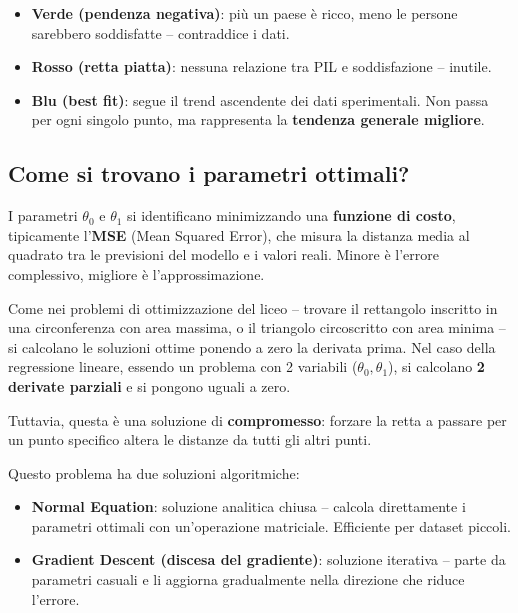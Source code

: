 \begin{itemize}
    \item \textbf{Verde (pendenza negativa)}: più un paese è ricco, meno le persone sarebbero soddisfatte -- contraddice i dati.
    \item \textbf{Rosso (retta piatta)}: nessuna relazione tra PIL e soddisfazione -- inutile.
    \item \textbf{Blu (best fit)}: segue il trend ascendente dei dati sperimentali. Non passa per ogni singolo punto, ma rappresenta la \textbf{tendenza generale migliore}.
\end{itemize}

\subsection{Come si trovano i parametri ottimali?}

I parametri $\theta_0$ e $\theta_1$ si identificano minimizzando una \textbf{funzione di costo}, tipicamente l'\textbf{MSE} (Mean Squared Error), che misura la distanza media al quadrato tra le previsioni del modello e i valori reali. Minore è l'errore complessivo, migliore è l'approssimazione.

\begin{exbox}
Come nei problemi di ottimizzazione del liceo -- trovare il rettangolo inscritto in una circonferenza con area massima, o il triangolo circoscritto con area minima -- si calcolano le soluzioni ottime ponendo a zero la derivata prima. Nel caso della regressione lineare, essendo un problema con 2 variabili ($\theta_0, \theta_1$), si calcolano \textbf{2 derivate parziali} e si pongono uguali a zero. 

Tuttavia, questa è una soluzione di \textbf{compromesso}: forzare la retta a passare per un punto specifico altera le distanze da tutti gli altri punti.
\end{exbox}


Questo problema ha due soluzioni algoritmiche:
\begin{itemize}
    \item \textbf{Normal Equation}: soluzione analitica chiusa -- calcola direttamente i parametri ottimali con un'operazione matriciale. Efficiente per dataset piccoli.
    \item \textbf{Gradient Descent (discesa del gradiente)}: soluzione iterativa -- parte da parametri casuali e li aggiorna gradualmente nella direzione che riduce l'errore.
\end{itemize}

